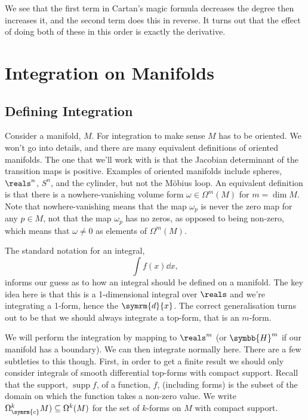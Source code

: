 \documentclass[fleqn]{NotesClass}
\renewcommand{\dl}{\symrm{d}}
\newcommand{\upperHalfSpace}{\symbb{H}}
\newcommand{\compact}{\symrm{c}}
\DeclareMathOperator{\supp}{supp}
\begin{document}
    We see that the first term in Cartan's magic formula decreases the degree then increases it, and the second term does this in reverse.
    It turns out that the effect of doing both of these in this order is exactly the derivative.
    
    \chapter{Integration on Manifolds}
    \section{Defining Integration}
    Consider a manifold, \(M\).
    For integration to make sense \(M\) has to be oriented.
    We won't go into details, and there are many equivalent definitions of oriented manifolds.
    The one that we'll work with is that the Jacobian determinant of the transition maps is positive.
    Examples of oriented manifolds include spheres, \(\reals^n\), \(S^n\), and the cylinder, but not the M\"obius loop.
    An equivalent definition is that there is a nowhere-vanishing volume form \(\omega \in \Omega^m(M)\) for \(m = \dim M\).
    Note that nowhere-vanishing means that the map \(\omega_p\) is never the zero map for any \(p \in M\), not that the map \(\omega_p\) has no zeros, as opposed to being non-zero, which means that \(\omega \ne 0\) as elements of \(\Omega^m(M)\).
    
    The standard notation for an integral,
    \begin{equation}
        \int f(x) \dd{x},
    \end{equation}
    informs our guess as to how an integral should be defined on a manifold.
    The key idea here is that this is a 1-dimensional integral over \(\reals\) and we're integrating a 1-form, hence the \(\dl{x}\).
    The correct generalisation turns out to be that we should always integrate a top-form, that is an \(m\)-form.
    
    We will perform the integration by mapping to \(\reals^m\) (or \(\upperHalfSpace^m\) if our manifold has a boundary).
    We can then integrate normally here.
    There are a few subtleties to this though.
    First, in order to get a finite result we should only consider integrals of smooth differential top-forms with compact support.
    Recall that the support, \(\supp f\), of a function, \(f\), (including forms) is the subset of the domain on which the function takes a non-zero value.
    We write \(\Omega_{\compact}^k{M}) \subseteq \Omega^k(M)\) for the set of \(k\)-forms on \(M\) with compact support.
    
\end{document}
